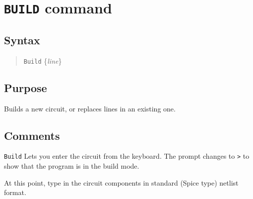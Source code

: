 %
%
%
%
\section{{\tt BUILD} command}
\subsection{Syntax}
\begin{verse}
{\tt Build} \{{\it line}\}
\end{verse}
\subsection{Purpose}

Builds a new circuit, or replaces lines in an existing one.
\subsection{Comments}

{\tt Build} Lets you enter the circuit from the keyboard.  The prompt changes 
to {\tt >} to show that the program is in the build mode.

At this point, type in the circuit components in standard (Spice type)
netlist format.

